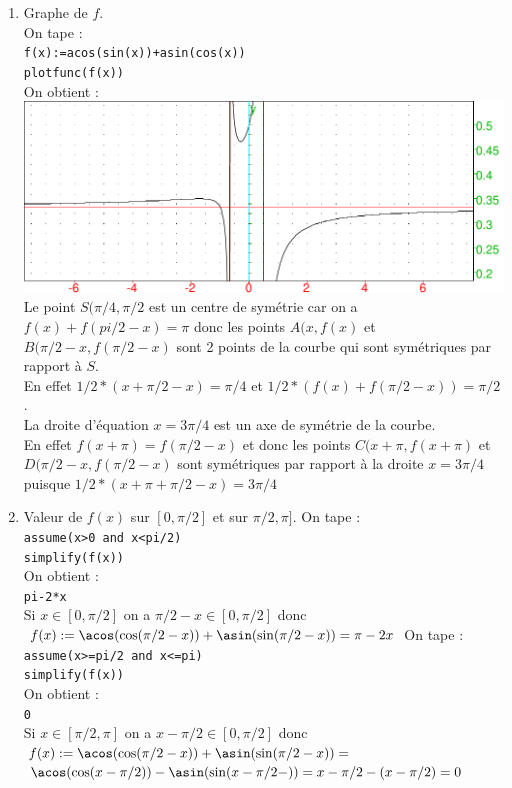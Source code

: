 \documentclass[a4paper,11pt]{book}
\begin{document}
\begin{enumerate}
\item Graphe de $f$.\\
On tape :\\
{\tt f(x):=acos(sin(x))+asin(cos(x))}\\
{\tt plotfunc(f(x))}\\
On obtient :\\
\includegraphics[width=\textwidth]{graphexo}
Le point $S(\pi/4,\pi/2$ est un centre de sym\'etrie car 
on a  $f(x)+f(pi/2-x)=\pi$ donc les points $A(x,f(x)$ et $B(\pi/2-x,f(\pi/2-x)$
sont 2 points de la courbe qui sont sym\'etriques par rapport \`a $S$.\\
En effet $1/2*(x+\pi/2-x)=\pi/4$ et 
$1/2*(f(x)+f(\pi/2-x))=\pi/2$.\\
La droite d'\'equation $x=3\pi/4$ est un axe de sym\'etrie de la courbe.\\
  En effet $f(x+\pi)=f(\pi/2-x)$ et donc les points
$C(x+\pi,f(x+\pi)$ et $D(\pi/2-x,f(\pi/2-x)$ sont sym\'etriques par rapport \`a la droite  $x=3\pi/4$
puisque $1/2*(x+\pi+\pi/2-x)=3\pi/4$

\item Valeur de $f(x)$ sur $[0,\pi/2]$ et sur $\pi/2,\pi]$.
On tape :\\
{\tt assume(x>0 and x<pi/2)}\\
{\tt simplify(f(x))}\\
On obtient :\\
{\tt pi-2*x}\\
Si $x\in [0,\pi/2]$ on a $\pi/2-x\in [0,\pi/2]$ donc
$f(x):=\acos(\cos(\pi/2-x))+\asin(\sin(\pi/2-x))=\pi-2x$
On tape :\\
{\tt assume(x>=pi/2 and x<=pi)}\\
{\tt simplify(f(x))}\\
On obtient :\\
{\tt 0}\\
Si $x\in [\pi/2,\pi]$ on a $x-\pi/2\in [0,\pi/2]$ donc
$f(x):=\acos(\cos(\pi/2-x))+\asin(\sin(\pi/2-x))=$\\
$\acos(\cos(x-\pi/2))-\asin(\sin(x-\pi/2-))=x-\pi/2-(x-\pi/2)=0$

\end{enumerate}
\end{document}
